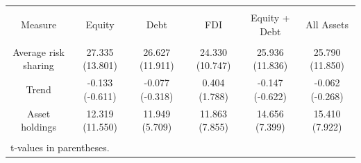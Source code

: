 
\begin{tabular}{@{\extracolsep{5pt}} cccccc} 
\\[-1.8ex]\hline 
\hline \\[-1.8ex] 
Measure & Equity & Debt & FDI & Equity + Debt & All Assets \\ 
\hline \\[-1.8ex] 
Average risk sharing & 27.335 (13.801) & 26.627 (11.911) & 24.330 (10.747) & 25.936 (11.836) & 25.790 (11.850) \\ 
Trend & -0.133 (-0.611) & -0.077 (-0.318) & 0.404 (1.788) & -0.147 (-0.622) & -0.062 (-0.268) \\ 
Asset holdings & 12.319 (11.550) & 11.949 (5.709) & 11.863 (7.855) & 14.656 (7.399) & 15.410 (7.922) \\ 
\hline \\[-1.8ex] 
\multicolumn{6}{l}{t-values in parentheses.} \\ 
\end{tabular} 
